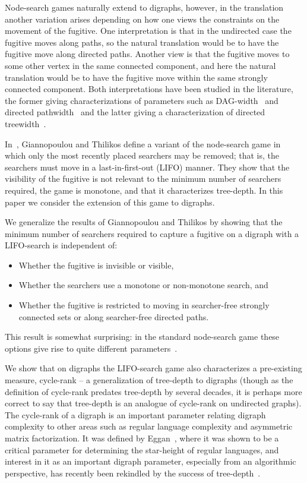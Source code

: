 \documentclass{llncs}
\begin{document}
Node-search games naturally extend to digraphs, however, in the translation another variation arises depending on how one views the constraints on the movement of the fugitive.  One interpretation is that in the undirected case the fugitive moves along paths, so the natural translation would be to have the fugitive move along directed paths.  Another view is that the fugitive moves to some other vertex in the same connected component, and here the natural translation would be to have the fugitive move within the same strongly connected component.  Both interpretations have been studied in the literature, the former giving characterizations of parameters such as DAG-width~\cite{BDHK06,Obd06} and directed pathwidth~\cite{Bar05} and the latter giving a characterization of directed treewidth~\cite{JRST01}.  

In~\cite{GT11}, Giannopoulou and Thilikos define a variant of the node-search game in which only the most recently placed searchers may be removed; that is, the searchers must move in a last-in-first-out (LIFO) manner.  They show that the visibility of the fugitive is not relevant to the minimum number of searchers required, the game is monotone, and that it characterizes tree-depth.  In this paper we consider the extension of this game to digraphs.

We generalize the results of Giannopoulou and Thilikos by showing that
the minimum number of searchers required to capture a fugitive on a digraph with a LIFO-search is independent of:
\begin{itemize}
\item Whether the fugitive is invisible or visible,
\item Whether the searchers use a monotone or non-monotone search, and
\item Whether the fugitive is restricted to moving in searcher-free strongly connected sets or along searcher-free directed paths.
\end{itemize}
This result is somewhat surprising: in the standard node-search game these options give rise to quite different parameters~\cite{Bar05,BDHK06,KO07}.

We show that on digraphs the LIFO-search game also characterizes a pre-existing measure, cycle-rank -- a generalization of tree-depth to digraphs (though as the definition of cycle-rank predates tree-depth by several decades, it is perhaps more correct to say that tree-depth is an analogue of cycle-rank on undirected graphs).  The cycle-rank of a digraph is an important parameter relating digraph complexity to other areas such as regular language complexity and asymmetric matrix factorization.  It was defined by Eggan~\cite{Egg63}, where it was shown to be a critical parameter for determining the star-height of regular languages,  and interest in it as an important digraph parameter, especially from an algorithmic perspective, has recently been rekindled by the success of tree-depth~\cite{EL08,Gru08,GHKLOR09}. 
\end{document}

